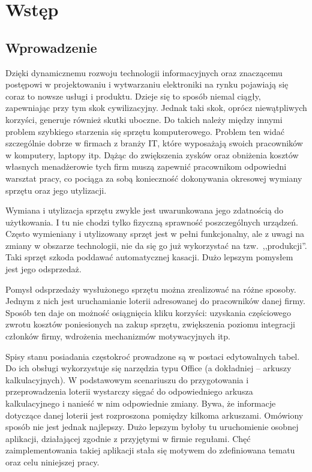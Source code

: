 \chapter{Wstęp}
\section{Wprowadzenie}
Dzięki dynamicznemu rozwoju technologii informacyjnych oraz znaczącemu postępowi w projektowaniu i wytwarzaniu elektroniki na rynku pojawiają się coraz to nowsze usługi i produktu. Dzieje się to sposób niemal ciągły, zapewniając przy tym skok cywilizacyjny. Jednak taki skok, oprócz niewątpliwych korzyści, generuje również skutki uboczne. Do takich należy między innymi problem szybkiego starzenia się sprzętu komputerowego. Problem ten widać szczególnie dobrze w firmach z branży IT, które wyposażają swoich pracowników w komputery, laptopy itp. Dążąc do zwiększenia zysków oraz obniżenia kosztów własnych menadżerowie tych firm muszą zapewnić pracownikom odpowiedni warsztat pracy, co pociąga za sobą konieczność dokonywania okresowej wymiany sprzętu oraz jego utylizacji.

Wymiana i utylizacja sprzętu zwykle jest uwarunkowana jego zdatnością do użytkowania. I tu nie chodzi tylko fizyczną sprawność poszczególnych urządzeń. Często wymieniany i utylizowany sprzęt jest w pełni funkcjonalny, ale z uwagi na zmiany w obszarze technologii, nie da się go już wykorzystać na tzw.\ ,,produkcji''. Taki sprzęt szkoda poddawać automatycznej kasacji. Dużo lepszym pomysłem jest jego odsprzedaż. 

Pomysł odsprzedaży wysłużonego sprzętu można zrealizować na różne sposoby. Jednym z nich jest uruchamianie loterii adresowanej do pracowników danej firmy. Sposób ten daje on możność osiągnięcia kliku korzyści: uzyskania częściowego zwrotu kosztów poniesionych na zakup sprzętu, zwiększenia poziomu integracji członków firmy, wdrożenia mechanizmów motywacyjnych itp.


Spisy stanu posiadania częstokroć prowadzone są w postaci edytowalnych tabel. Do ich obsługi wykorzystuje się narzędzia typu Office (a dokładniej -- arkuszy kalkulacyjnych). W podstawowym scenariuszu do przygotowania i przeprowadzenia loterii wystarczy sięgać do odpowiedniego arkusza kalkulacyjnego i nanieść w nim odpowiednie zmiany.
Bywa, że informacje dotyczące danej loterii jest rozproszona pomiędzy kilkoma arkuszami. Omówiony sposób nie jest jednak najlepszy. Dużo lepszym byłoby tu uruchomienie osobnej aplikacji, działającej zgodnie z przyjętymi w firmie regułami. Chęć zaimplementowania takiej aplikacji stała się motywem do zdefiniowana tematu oraz celu niniejszej pracy.

